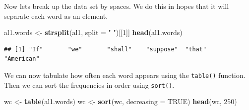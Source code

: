 \documentclass[
]{book}
\newenvironment{Shaded}{\begin{snugshade}}{\end{snugshade}}
\newcommand{\DataTypeTok}[1]{\textcolor[rgb]{0.13,0.29,0.53}{#1}}
\newcommand{\DecValTok}[1]{\textcolor[rgb]{0.00,0.00,0.81}{#1}}
\newcommand{\KeywordTok}[1]{\textcolor[rgb]{0.13,0.29,0.53}{\textbf{#1}}}
\newcommand{\NormalTok}[1]{#1}
\newcommand{\OtherTok}[1]{\textcolor[rgb]{0.56,0.35,0.01}{#1}}
\newcommand{\StringTok}[1]{\textcolor[rgb]{0.31,0.60,0.02}{#1}}
\begin{document}
Now lets break up the data set by spaces. We do this in hopes that it will separate each word as an element.

\begin{Shaded}
\begin{Highlighting}[]
\NormalTok{al1.words <-}\StringTok{ }\KeywordTok{strsplit}\NormalTok{(al1, }\DataTypeTok{split =} \StringTok{" "}\NormalTok{)[[}\DecValTok{1}\NormalTok{]]}
\KeywordTok{head}\NormalTok{(al1.words)}
\end{Highlighting}
\end{Shaded}

\begin{verbatim}
## [1] "If"       "we"       "shall"    "suppose"  "that"     "American"
\end{verbatim}

We can now tabulate how often each word appears using the \texttt{table()} function. Then we can sort the frequencies in order using \texttt{sort()}.

\begin{Shaded}
\begin{Highlighting}[]
\NormalTok{wc <-}\StringTok{ }\KeywordTok{table}\NormalTok{(al1.words)}
\NormalTok{wc <-}\StringTok{ }\KeywordTok{sort}\NormalTok{(wc, }\DataTypeTok{decreasing =} \OtherTok{TRUE}\NormalTok{)}
\KeywordTok{head}\NormalTok{(wc, }\DecValTok{250}\NormalTok{)}
\end{Highlighting}
\end{Shaded}
\end{document}
